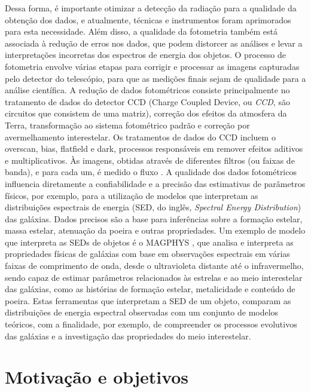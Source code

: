 Dessa forma, é importante otimizar a detecção da radiação para a qualidade da obtenção dos dados, e atualmente, técnicas e instrumentos foram aprimorados para esta necessidade. Além disso, a qualidade da fotometria também está associada à redução de erros nos dados, que podem distorcer as análises e levar a interpretações incorretas dos espectros de energia dos objetos. O processo de fotometria envolve várias etapas para corrigir e processar as imagens capturadas pelo detector do telescópio, para que as medições finais sejam de qualidade para a análise científica. A redução de dados fotométricos consiste principalmente no tratamento de dados do detector CCD (Charge Coupled Device, ou \emph{CCD}, são circuitos que consistem de uma matriz), correção dos efeitos da atmosfera da Terra, transformação ao sistema fotométrico padrão e correção por avermelhamento interestelar. Os tratamentos de dados do CCD incluem o overscan, bias, flatfield e dark, processos responsáveis em remover efeitos aditivos e multiplicativos. Às imagens, obtidas através de diferentes filtros (ou faixas de banda), e para cada um, é medido o fluxo \cite{2023Kepler}. A qualidade dos dados fotométricos influencia diretamente a confiabilidade e a precisão das estimativas de parâmetros físicos, por exemplo, para a utilização de modelos que interpretam as distribuições espectrais de energia (SED, do inglês, \emph{Spectral Energy Distribution}) das galáxias. Dados precisos são a base para inferências sobre a formação estelar, massa estelar, atenuação da poeira e outras propriedades. Um exemplo de modelo que interpreta as SEDs de objetos é o MAGPHYS \cite{2011ascl.soft06010D}, que analisa e interpreta as propriedades físicas de galáxias com base em observações espectrais em várias faixas de comprimento de onda, desde o ultravioleta distante até o infravermelho, sendo capaz de estimar parâmetros relacionados às estrelas e ao meio interestelar das galáxias, como as histórias de formação estelar, metalicidade e conteúdo de poeira. Estas ferramentas que interpretam a SED de um objeto, comparam as distribuições de energia espectral observadas com um conjunto de modelos teóricos, com a finalidade, por exemplo, de compreender os processos evolutivos das galáxias e a investigação das propriedades do meio interestelar.

\section{Motivação e objetivos}

